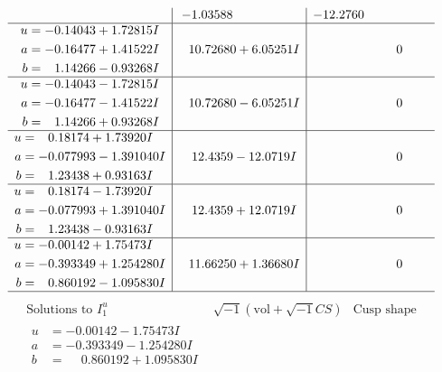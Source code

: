 \documentclass[1p]{elsarticle_modified}
\theoremstyle{definition}
\newcommand{\I}{\sqrt{-1}}
\begin{document}
$$\begin{array}{c|c|c}
 & -1.03588\phantom{ +0.000000I} & -12.2760\phantom{ +0.000000I} \\ \hline\begin{aligned}
u &= -0.14043 + 1.72815 I \\
a &= -0.16477 + 1.41522 I \\
b &= \phantom{-}1.14266 - 0.93268 I\end{aligned}
 & \phantom{-}10.72680 + 6.05251 I & \phantom{-0.000000 } 0 \\ \hline\begin{aligned}
u &= -0.14043 - 1.72815 I \\
a &= -0.16477 - 1.41522 I \\
b &= \phantom{-}1.14266 + 0.93268 I\end{aligned}
 & \phantom{-}10.72680 - 6.05251 I & \phantom{-0.000000 } 0 \\ \hline\begin{aligned}
u &= \phantom{-}0.18174 + 1.73920 I \\
a &= -0.077993 - 1.391040 I \\
b &= \phantom{-}1.23438 + 0.93163 I\end{aligned}
 & \phantom{-}12.4359 - 12.0719 I & \phantom{-0.000000 } 0 \\ \hline\begin{aligned}
u &= \phantom{-}0.18174 - 1.73920 I \\
a &= -0.077993 + 1.391040 I \\
b &= \phantom{-}1.23438 - 0.93163 I\end{aligned}
 & \phantom{-}12.4359 + 12.0719 I & \phantom{-0.000000 } 0 \\ \hline\begin{aligned}
u &= -0.00142 + 1.75473 I \\
a &= -0.393349 + 1.254280 I \\
b &= \phantom{-}0.860192 - 1.095830 I\end{aligned}
 & \phantom{-}11.66250 + 1.36680 I & \phantom{-0.000000 } 0\\
 \hline 
 \end{array}$$\newpage$$\begin{array}{c|c|c}  
\text{Solutions to }I^u_{1}& \I (\text{vol} + \sqrt{-1}CS) & \text{Cusp shape}\\
 \hline 
\begin{aligned}
u &= -0.00142 - 1.75473 I \\
a &= -0.393349 - 1.254280 I \\
b &= \phantom{-}0.860192 + 1.095830 I\end{aligned}

\end{array}$$
\end{document}

